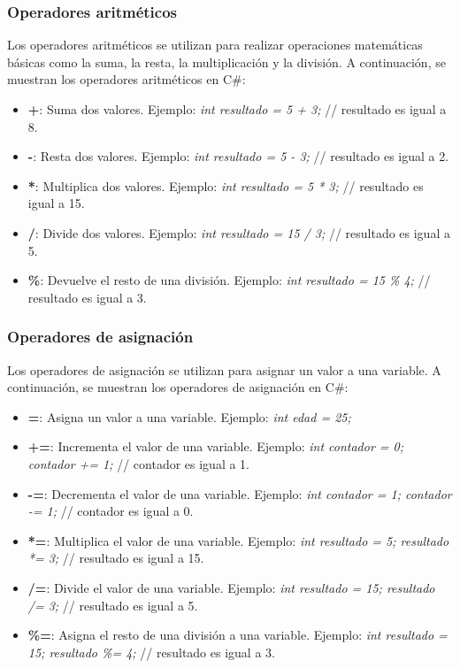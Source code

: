 \documentclass[executivepaper]{article}
\begin{document}
\subsubsection*{Operadores aritméticos}

Los operadores aritméticos se utilizan para realizar operaciones matemáticas básicas como la suma, la resta, la multiplicación y la división. A continuación, se muestran los operadores aritméticos en C\#:

\begin{itemize}
    \item \textbf{+}: Suma dos valores. Ejemplo: \emph{int resultado = 5 + 3;} // resultado es igual a 8.
    \item \textbf{-}: Resta dos valores. Ejemplo: \emph{int resultado = 5 - 3;} // resultado es igual a 2.
    \item \textbf{*}: Multiplica dos valores. Ejemplo: \emph{int resultado = 5 * 3;} // resultado es igual a 15.
    \item \textbf{/}: Divide dos valores. Ejemplo: \emph{int resultado = 15 / 3;} // resultado es igual a 5.
    \item \textbf{\%}: Devuelve el resto de una división. Ejemplo: \emph{int resultado = 15 \% 4;} // resultado es igual a 3.
\end{itemize}

\subsubsection*{Operadores de asignación}

Los operadores de asignación se utilizan para asignar un valor a una variable. A continuación, se muestran los operadores de asignación en C\#:

\begin{itemize}
    \item \textbf{=}: Asigna un valor a una variable. Ejemplo: \emph{int edad = 25;}
    \item \textbf{+=}: Incrementa el valor de una variable. Ejemplo: \emph{int contador = 0; contador += 1;} // contador es igual a 1.
    \item \textbf{-=}: Decrementa el valor de una variable. Ejemplo: \emph{int contador = 1; contador -= 1;} // contador es igual a 0.
    \item \textbf{*=}: Multiplica el valor de una variable. Ejemplo: \emph{int resultado = 5; resultado *= 3;} // resultado es igual a 15.
    \item \textbf{/=}: Divide el valor de una variable. Ejemplo: \emph{int resultado = 15; resultado /= 3;} // resultado es igual a 5.
    \item \textbf{\%=}: Asigna el resto de una división a una variable. Ejemplo: \emph{int resultado = 15; resultado \%= 4;} // resultado es igual a 3.
    \end{itemize}
\end{document}
